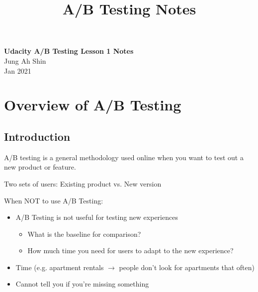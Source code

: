 \documentclass[10pt]{article}
\theoremstyle{definition}
\begin{document}
\setcounter{section}{0}
\title{A/B Testing Notes}

\thispagestyle{empty}

\begin{center}
{\LARGE \bf Udacity A/B Testing Lesson 1 Notes}\\
{\large Jung Ah Shin}\\
Jan 2021
\end{center}
\section{Overview of A/B Testing}
\subsection{Introduction}
A/B testing is a general methodology used online when you want to test out a new product or feature.

Two sets of users: Existing product vs. New version 

When NOT to use A/B Testing:
\begin{itemize}
\item A/B Testing is not useful for testing new experiences
\begin{itemize}
\item What is the baseline for comparison?
\item How much time you need for users to adapt to the new experience?
\end{itemize}
\item Time (e.g. apartment rentals $\rightarrow$ people don't look for apartments that often) 
\item Cannot tell you if you're missing something
\end{itemize}
\end{document}

